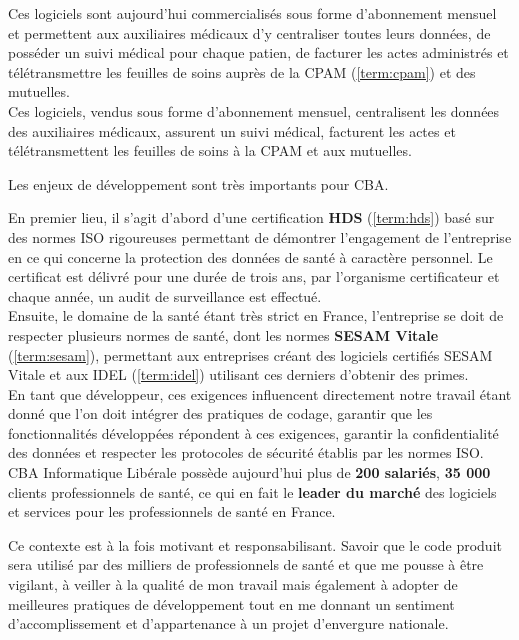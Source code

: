 \documentclass{article}
\begin{document}
Ces logiciels sont aujourd'hui commercialisés sous forme d'abonnement mensuel et permettent aux auxiliaires médicaux d'y centraliser toutes leurs données, de posséder un suivi médical pour chaque patien, de facturer les actes administrés et télétransmettre les feuilles de soins auprès de la CPAM (\ref{term:cpam}) et des mutuelles.\\

Ces logiciels, vendus sous forme d'abonnement mensuel, centralisent les données des auxiliaires médicaux, assurent un suivi médical, facturent les actes et télétransmettent les feuilles de soins à la CPAM et aux mutuelles.

Les enjeux de développement sont très importants pour CBA.

En premier lieu, il s'agit d'abord d'une certification \textbf{HDS} (\ref{term:hds}) basé sur des normes ISO rigoureuses permettant de démontrer l'engagement de l'entreprise en ce qui concerne la protection des données de santé à caractère personnel. Le certificat est délivré pour une durée de trois ans, par l'organisme certificateur et chaque année, un audit de surveillance est effectué. \\

Ensuite, le domaine de la santé étant très strict en France, l'entreprise se doit de respecter plusieurs normes de santé, dont les normes \textbf{SESAM Vitale} (\ref{term:sesam}), permettant aux entreprises créant des logiciels certifiés SESAM Vitale et aux IDEL (\ref{term:idel}) utilisant ces derniers d'obtenir des primes. \\

En tant que développeur, ces exigences influencent directement notre travail étant donné que l'on doit intégrer des pratiques de codage, garantir que les fonctionnalités développées répondent à ces exigences, garantir la confidentialité des données et respecter les protocoles de sécurité établis par les normes ISO. \\

CBA Informatique Libérale possède aujourd'hui plus de \textbf{200 salariés}, \textbf{35 000} clients professionnels de santé, ce qui en fait le \textbf{leader du marché} des logiciels et services pour les professionnels de santé en France.

Ce contexte est à la fois motivant et responsabilisant. Savoir que le code produit sera utilisé par des milliers de professionnels de santé et que  me pousse à être vigilant, à veiller à la qualité de mon travail mais également à adopter de meilleures pratiques de développement tout en me donnant un sentiment d'accomplissement et d'appartenance à un projet d'envergure nationale.
\end{document}
